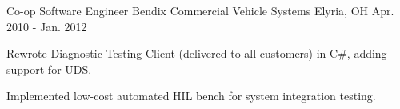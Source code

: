 \begin{cventries}
\iflongform
  \cventry
    {Co-op Software Engineer} %
    {Bendix Commercial Vehicle Systems} %
    {Elyria, OH} %
    {Apr. 2010 - Jan. 2012} %
    {%
      \begin{cvitems} %
        \item {Rewrote Diagnostic Testing Client (delivered to all customers) in C\#, adding support for UDS.}
        \item {Implemented low-cost automated HIL bench for system integration testing.}
      \end{cvitems}%
    }%
\fi

\end{cventries}
